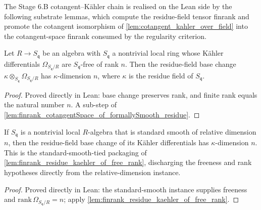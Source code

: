 The Stage 6.B cotangent--K\"ahler chain is realised on the Lean side by the
following substrate lemmas, which compute the residue-field tensor finrank and
promote the cotangent isomorphism of \cref{lem:cotangent_kahler_over_field} into
the cotangent-space finrank consumed by the regularity criterion.

\begin{lemma}
  \label{lem:finrank_residue_kaehler_of_free_rank}
  Let \(R \to S_{\mathfrak q}\) be an algebra with \(S_{\mathfrak q}\) a nontrivial
  local ring whose K\"ahler differentials \(\Omega_{S_{\mathfrak q}/R}\) are
  \(S_{\mathfrak q}\)-free of rank \(n\). Then the residue-field base change
  \(\kappa \otimes_{S_{\mathfrak q}} \Omega_{S_{\mathfrak q}/R}\) has
  \(\kappa\)-dimension \(n\), where \(\kappa\) is the residue field of \(S_{\mathfrak q}\).
\end{lemma}

\begin{proof}
  Proved directly in Lean: base change preserves rank, and finite rank equals the
  natural number \(n\). A sub-step of
  \cref{lem:finrank_cotangentSpace_of_formallySmooth_residue}.
\end{proof}

\begin{lemma}
  \label{lem:finrank_residue_kaehler_of_standardSmooth_reldim}
  If \(S_{\mathfrak q}\) is a nontrivial local \(R\)-algebra that is standard smooth
  of relative dimension \(n\), then the residue-field base change of its K\"ahler
  differentials has \(\kappa\)-dimension \(n\). This is the standard-smooth-tied
  packaging of \cref{lem:finrank_residue_kaehler_of_free_rank}, discharging the
  freeness and rank hypotheses directly from the relative-dimension instance.
\end{lemma}

\begin{proof}
  Proved directly in Lean: the standard-smooth instance supplies freeness and
  \(\mathrm{rank}\,\Omega_{S_{\mathfrak q}/R} = n\); apply
  \cref{lem:finrank_residue_kaehler_of_free_rank}.
\end{proof}

